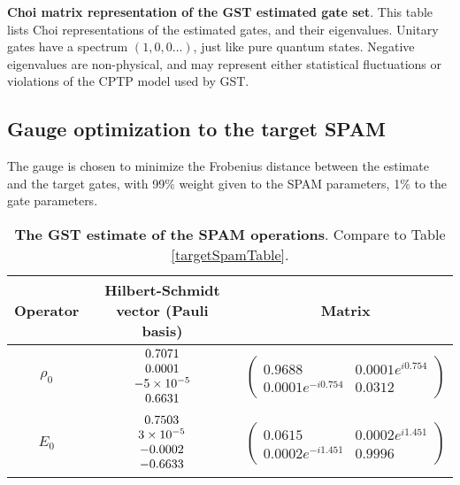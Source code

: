 {\begin{table}[h]
\begin{center}
\caption{\textbf{Choi matrix representation of the GST estimated gate set}.  This table lists Choi representations of the estimated gates, and their eigenvalues.  Unitary gates have a spectrum $(1,0,0\ldots)$, just like pure quantum states.  Negative eigenvalues are non-physical, and may represent either statistical fluctuations or violations of the CPTP model used by GST.\label{bestTargetGatesetChoiTable}}
\end{center}
\end{table}


\clearpage

\subsection{Gauge optimization to the target SPAM}
The gauge is chosen to minimize the Frobenius distance between the estimate and the target gates, with 99\% weight given to the SPAM parameters, 1\% to the gate parameters.

\begin{table}[h]
\begin{center}
\begin{tabular}[l]{|c|c|c|}
\hline
Operator & Hilbert-Schmidt vector (Pauli basis) & Matrix \\ \hline
$\rho_{0}$ & $ \begin{array}{c}
0.7071 \\ 
0.0001 \\ 
-5\times 10^{-5} \\ 
0.6631
 \end{array} $
 & $ \left(\!\!\begin{array}{cc}
0.9688 & 0.0001e^{i0.754} \\ 
0.0001e^{-i0.754} & 0.0312
 \end{array}\!\!\right) $
 \\ \hline
$E_{0}$ & $ \begin{array}{c}
0.7503 \\ 
3\times 10^{-5} \\ 
-0.0002 \\ 
-0.6633
 \end{array} $
 & $ \left(\!\!\begin{array}{cc}
0.0615 & 0.0002e^{i1.451} \\ 
0.0002e^{-i1.451} & 0.9996
 \end{array}\!\!\right) $
 \\ \hline
\end{tabular}

\caption{\textbf{The GST estimate of the SPAM operations}.  Compare to Table \ref{targetSpamTable}.\label{bestTargetSpamGatesetSpamTable}}
\end{center}
\end{table}

}
